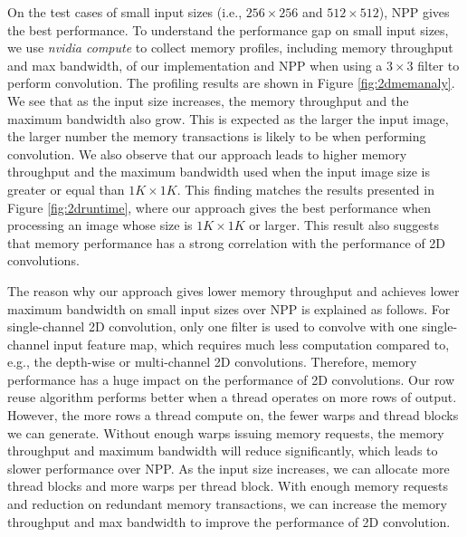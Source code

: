 On the test cases of small input sizes (i.e., $256 \times 256$ and $512 \times 512$), NPP gives the best performance. To understand the
performance gap on small input sizes, we use \emph{nvidia compute} to collect memory profiles, including memory throughput and max
bandwidth, of our implementation and NPP when using a $3 \times 3$ filter to perform convolution. The profiling results are shown in Figure
\ref{fig:2dmemanaly}.  We see that as the input size increases, the memory throughput and the maximum bandwidth also grow. This is expected
as the larger the input image, the larger number the memory transactions is likely to be when performing convolution.  We also observe that
our approach leads to higher memory throughput and the maximum bandwidth used when the input image size is greater or equal than $1K \times
1K$. This finding matches the results presented in Figure \ref{fig:2druntime}, where our approach gives the best performance when
processing an image whose size is $1K \times 1K$ or larger. This result also suggests that memory performance has a strong correlation with
the performance of 2D convolutions.


The reason why our approach gives lower memory throughput and achieves lower maximum bandwidth on small input sizes over NPP is explained
as follows. For single-channel 2D convolution, only one filter is used to convolve with one single-channel input feature map, which
requires much less computation compared to, e.g., the depth-wise or multi-channel 2D convolutions. Therefore, memory performance has a huge
impact on the performance of 2D convolutions. Our row reuse algorithm performs better when a thread operates on more rows of output.
However, the more rows a thread compute on, the fewer warps and thread blocks we can generate. Without enough warps issuing memory
requests, the memory throughput and maximum bandwidth will reduce significantly, which leads to slower performance over NPP. As the input
size increases, we can allocate more thread blocks and more warps per thread block. With enough memory requests and reduction on redundant
memory transactions, we can increase the memory throughput and max bandwidth to improve the performance of 2D convolution.



